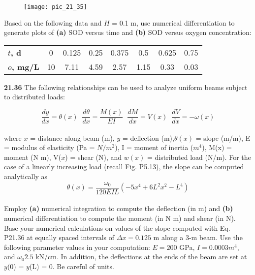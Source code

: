\documentclass[../main.tex]{subfiles}
\begin{document}
\begin{figure}[hbt!]
	\texttt{[image: pic\_21\_35]}
	\label{pic.21.35}
\end{figure}
\begin{multicols}{2}

Based on the following data and $H$ = 0.1 m, use numerical differentiation to generate plots of \textbf{(a)} SOD versus
time and \textbf{(b)} SOD versus oxygen concentration:\\
\begin{tabular}{lccccccc}
	\hline

	\scriptsize{\textbf{$t$, d}} & \scriptsize{0} & \scriptsize{0.125} & \scriptsize{0.25} & \scriptsize{0.375} & \scriptsize{0.5} & \scriptsize{0.625} & \scriptsize{0.75}\\
	
	\scriptsize{\textbf{$o$, mg/L}} & \scriptsize{10} & \scriptsize{7.11} & \scriptsize{4.59} & \scriptsize{2.57} & \scriptsize{1.15} & \scriptsize{0.33} & \scriptsize{0.03}\\
	
	\hline
\end{tabular}

\textbf{21.36} The following relationships can be used to analyze
uniform beams subject to distributed loads:

{$$ \dfrac{dy}{dx} = \theta(x) \; \; \dfrac{d\theta}{dx} = \dfrac{M(x)}{EI} \; \; \dfrac{dM}{dx} = V(x) \; \; \dfrac{dV}{dx} = -\omega (x) $$}\\
where $x$ = distance along beam (m), $y$ = deflection (m),$\theta(x)$ = slope (m/m), E = modulus of elasticity (Pa = $N/m^2$),
I = moment of inertia ($m^4$), M(x) = moment (N m), V($x$) =
shear (N), and $w(x)$ = distributed load (N/m). For the case of
a linearly increasing load (recall Fig. P5.13), the slope can
be computed analytically as 
\begin{equation}
\tag{P21.36}
{\theta(x) = \dfrac{\omega_{0}}{120EIL}(-5x^4 + 6L^2x^2 - L^4)}
\end{equation}\\
Employ \textbf{(a)} numerical integration to compute the deflection
(in m) and \textbf{(b)} numerical differentiation to compute the
moment (in N m) and shear (in N). Base your numerical
calculations on values of the slope computed with
Eq. P21.36 at equally spaced intervals of $\Delta x = 0.125$ m along a 3-m beam. Use the following parameter values in
your computation: $E = 200$ GPa, $I = 0.0003 m^4$, and $\omega_{0} 2.5$ kN/cm. In addition, the deflections at the ends of the
beam are set at $y$(0) = $y$(L) = 0. Be careful of units.


\end{multicols}
\end{document}
